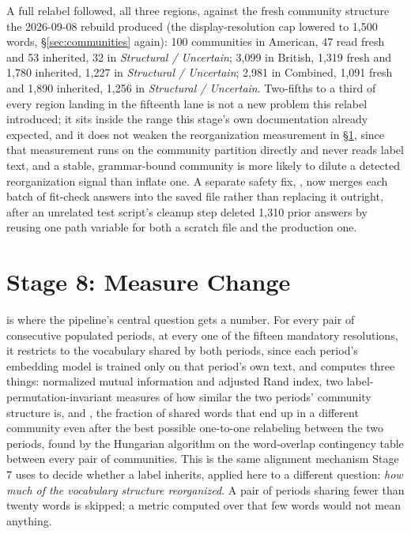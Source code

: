 \documentclass[11pt]{article}
\begin{document}
A full relabel followed, all three regions, against the fresh community
structure the 2026-09-08 rebuild produced (the display-resolution cap
lowered to 1{,}500 words, \S\ref{sec:communities} again): 100 communities in
American, 47 read fresh and 53 inherited, 32 in \emph{Structural /
Uncertain}; 3{,}099 in British, 1{,}319 fresh and 1{,}780 inherited,
1{,}227 in \emph{Structural / Uncertain}; 2{,}981 in Combined, 1{,}091
fresh and 1{,}890 inherited, 1{,}256 in \emph{Structural / Uncertain}.
Two-fifths to a third of every region landing in the fifteenth lane is
not a new problem this relabel introduced; it sits inside the range this
stage's own documentation already expected, and it does not weaken the
reorganization measurement in \S\ref{sec:metrics}, since that
measurement runs on the community partition directly and never reads
label text, and a stable, grammar-bound community is more likely to
dilute a detected reorganization signal than inflate one. A separate
safety fix, , now merges each batch of
fit-check answers into the saved file rather than replacing it outright,
after an unrelated test script's cleanup step deleted 1{,}310 prior
answers by reusing one path variable for both a scratch file and the
production one.

\section{Stage 8: Measure Change}
\label{sec:metrics}

 is where the pipeline's central question gets a
number. For every pair of consecutive populated periods, at every one of
the fifteen mandatory resolutions, it restricts to the vocabulary shared
by both periods, since each period's embedding model is trained only on
that period's own text, and computes three things: normalized mutual
information and adjusted Rand index, two label-permutation-invariant
measures of how similar the two periods' community structure is, and
, the fraction of shared words that end up in
a different community even after the best possible one-to-one
relabeling between the two periods, found by the Hungarian algorithm on
the word-overlap contingency table between every pair of communities.
This is the same alignment mechanism Stage 7 uses to decide whether a
label inherits, applied here to a different question: \emph{how much
of the vocabulary structure reorganized}. A pair of periods sharing
fewer than twenty
words is skipped; a metric computed over that few words would not mean
anything.
\end{document}
